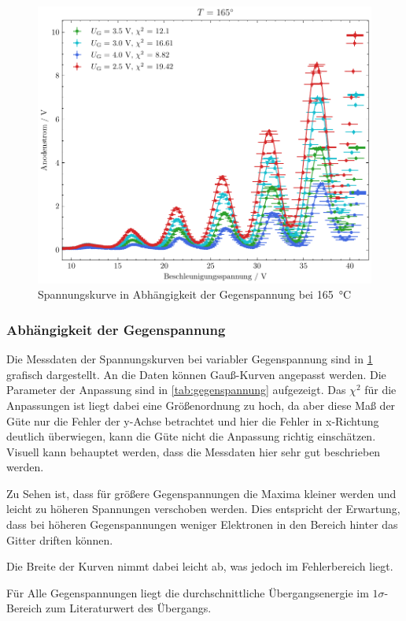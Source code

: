 \begin{figure}[htb]
    \centering
    \includegraphics[width=0.6\linewidth]{../figs/franck-hertz_gegenspannung}
    \caption{Spannungskurve in Abhängigkeit der Gegenspannung bei \SI{165}{\celsius}}
    \label{fig:gegenspannung}
\end{figure}

\subsubsection{Abhängigkeit der Gegenspannung}\label{sec:franck-hertz-gegen}
Die Messdaten der Spannungskurven bei variabler Gegenspannung sind in 
\cref{fig:gegenspannung} grafisch dargestellt. An die Daten können Gauß-Kurven
angepasst werden. Die Parameter der Anpassung sind in \cref{tab:gegenspannung}
aufgezeigt. Das $\chi^2$ für die Anpassungen ist liegt dabei eine Größenordnung zu
hoch, da aber diese Maß der Güte nur die Fehler der y-Achse betrachtet und 
hier die Fehler in x-Richtung deutlich überwiegen, kann die Güte 
nicht die Anpassung richtig einschätzen. Visuell kann behauptet werden,
dass die Messdaten hier sehr gut beschrieben werden.

Zu Sehen ist, dass für größere Gegenspannungen 
die Maxima kleiner werden und leicht zu höheren Spannungen verschoben werden. 
Dies entspricht der Erwartung, dass bei höheren Gegenspannungen weniger 
Elektronen in den Bereich hinter das Gitter driften können.

Die Breite der Kurven nimmt dabei leicht ab, was jedoch im Fehlerbereich liegt.

Für Alle Gegenspannungen liegt die durchschnittliche Übergangsenergie im $1\sigma$-Bereich 
zum Literaturwert des Übergangs.

